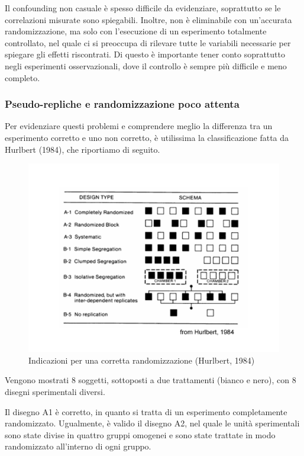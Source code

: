 \documentclass[a4paper,12pt,oneside]{book}
\begin{document}
Il confounding non casuale è spesso difficile da evidenziare, soprattutto se le correlazioni misurate sono spiegabili. Inoltre, non è eliminabile con un'accurata randomizzazione, ma solo con l'esecuzione di un esperimento totalmente controllato, nel quale ci si preoccupa di rilevare tutte le variabili necessarie per spiegare gli effetti riscontrati. Di questo è importante tener conto soprattutto negli esperimenti osservazionali, dove il controllo è sempre più difficile e meno completo.

\hypertarget{pseudo-repliche-e-randomizzazione-poco-attenta}{%
\subsubsection{Pseudo-repliche e randomizzazione poco attenta}\label{pseudo-repliche-e-randomizzazione-poco-attenta}}

Per evidenziare questi problemi e comprendere meglio la differenza tra un esperimento corretto e uno non corretto, è utilissima la classificazione fatta da Hurlbert (1984), che riportiamo di seguito.

\begin{figure}

{\centering \includegraphics[width=0.9\linewidth]{_images/Randomisation} 

}

\caption{Indicazioni per una corretta randomizzazione (Hurlbert, 1984)}\label{fig:figName23}
\end{figure}

Vengono mostrati 8 soggetti, sottoposti a due trattamenti (bianco e nero), con 8 disegni sperimentali diversi.

Il disegno A1 è corretto, in quanto si tratta di un esperimento completamente randomizzato. Ugualmente, è valido il disegno A2, nel quale le unità sperimentali sono state divise in quattro gruppi omogenei e sono state trattate in modo randomizzato all'interno di ogni gruppo.
\end{document}
